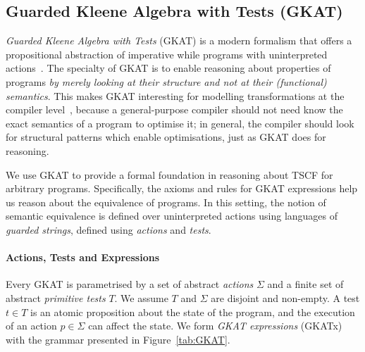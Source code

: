 \subsection{Guarded Kleene Algebra with Tests (GKAT)}
\emph{Guarded Kleene Algebra with Tests} (GKAT) is a modern formalism that offers a propositional abstraction of imperative while programs with uninterpreted actions~\cite{GKAT}. The specialty of GKAT is to enable reasoning about properties of programs \emph{by merely looking at their structure and not at their (functional) semantics}. This makes GKAT interesting for modelling transformations at the compiler level~\cite{KATForCompilers}, because a general-purpose compiler should not need know the exact semantics of a program to optimise it; in general, the compiler should look for structural patterns which enable optimisations, just as GKAT does for reasoning. 

We use GKAT to provide a formal foundation in reasoning about TSCF for arbitrary programs. Specifically, the axioms and rules for GKAT 
expressions help us reason about the equivalence of programs. In this setting, the notion of 
semantic equivalence is defined over uninterpreted actions using languages of \emph{guarded strings}, defined using \emph{actions} and \emph{tests}. 

\paragraph*{Actions, Tests and Expressions}
Every GKAT is parametrised by a set of abstract \emph{actions} $\Sigma$ and a finite set of abstract \emph{primitive tests} $T$. We assume $T$ and $\Sigma$ are disjoint and non-empty. A test $t\in T$ is an atomic proposition about the state of the program, and the execution of an action $p \in \Sigma$ can affect the state. We form \emph{GKAT expressions} (GKATx) with the grammar presented in Figure~\ref{tab:GKAT}. 


